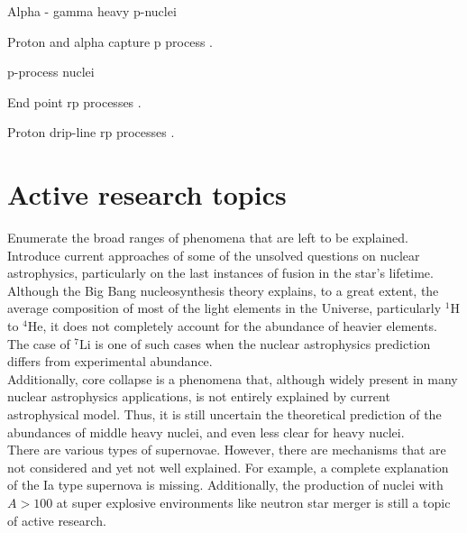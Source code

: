 \documentclass[openany]{book}
\begin{document}
Alpha - gamma heavy p-nuclei \cite{kiss_szucs_gyurky_fulop_farkas_kertesz_somorjai_laubenstein_frohlich_rauscher_et_2011} 

Proton and alpha capture p process \cite{harissopulos_lagoyannis_spyrou_zarkadas_galanopoulos_perdikakis_becker_rolfs_strieder_kunz_et_2005} \cite{harissopulos_spyrou_lagoyannis_zarkadas_becker_rolfs_strieder_hammer_dewald_zell_et_2005}.

p-process nuclei 
\cite{quinn_spyrou_simon_battaglia_couder_deyoung_dombos_fang_gosrres_kontos_et_2013}

End point rp processes  \cite{schatz_aprahamian_barnard_bildsten_cumming_ouellette_rauscher_thielemann_wiescher_2001}.

Proton drip-line rp processes \cite{brown_clement_schatz_volya_richter_2002}.

\section{Active research topics} \label{sec:activeResearch}

Enumerate the broad ranges of phenomena that are left to be explained.  \\

Introduce current approaches of some of the unsolved questions on nuclear astrophysics, particularly on the last instances of fusion in the star's lifetime. \\

Although the Big Bang nucleosynthesis theory explains, to a great extent, the average composition of most of the light elements in the Universe, particularly $\mathrm{{}^{1}H}$ to   $\mathrm{{}^{4}He}$, it does not completely account for the abundance of heavier elements. The case of  $\mathrm{{}^{7}Li}$ is one of such cases when the nuclear astrophysics prediction differs from experimental abundance. \\

Additionally, core collapse is a phenomena that, although widely present in many nuclear astrophysics applications, is not entirely explained by current astrophysical model. Thus, it is still uncertain the theoretical prediction of the abundances of middle heavy nuclei, and even less clear for heavy nuclei. \\ 

There are various types of supernovae. However, there are mechanisms that are not considered and yet not well explained. For example, a complete explanation of the Ia type supernova is missing. Additionally, the production of nuclei with $A > 100$ at super explosive environments like neutron star merger is still a topic of active research.  \\
\end{document}
